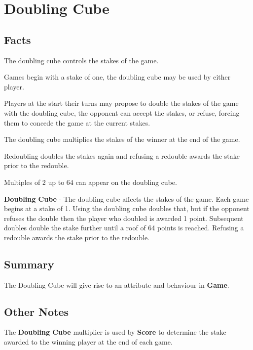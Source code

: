 \section{Doubling Cube}

\subsection{Facts}

\begin{dashed}
    \item The doubling cube controls the stakes of the game.
    \item Games begin with a stake of one, the doubling cube may be used by either player.
    \item Players at the start their turns may propose to double the stakes of the game
          with the doubling cube, the opponent can accept the stakes, or refuse, forcing them
          to concede the game at the current stakes.
    \item The doubling cube multiplies the stakes of the winner at the end of the game.
    \item Redoubling doubles the stakes again and refusing a redouble awards the stake prior to the redouble.
    \item Multiples of 2 up to 64 can appear on the doubling cube.
\end{dashed}

\noindent
\newline\textbf{Doubling Cube} - The doubling cube affects the stakes of the game.
Each game begins at a stake of 1. Using the doubling cube doubles that,
but if the opponent refuses the double then the player who doubled is awarded 1 point.
Subsequent doubles double the stake further until a roof of 64 points is reached.
Refusing a redouble awards the stake prior to the redouble.

\subsection{Summary}
The Doubling Cube will give rise to an attribute and behaviour in \textbf{Game}.

\subsection{Other Notes}

\begin{dashed}
    \item The \textbf{Doubling Cube} multiplier is used by \textbf{Score} to determine the stake awarded to the winning player at the end of each game.
\end{dashed}

